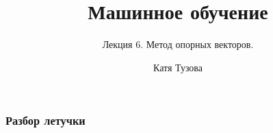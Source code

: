 \documentclass[12pt]{beamer}
\author{Катя Тузова}
\title{Машинное обучение}
\subtitle{Лекция 6. Метод опорных векторов.}
\date{}
\begin{document}
\frame{\titlepage}

\begin{frame}\frametitle{Разбор летучки}
\end{frame}



\begin{frame}\frametitle{}
\end{frame}
\end{document}
